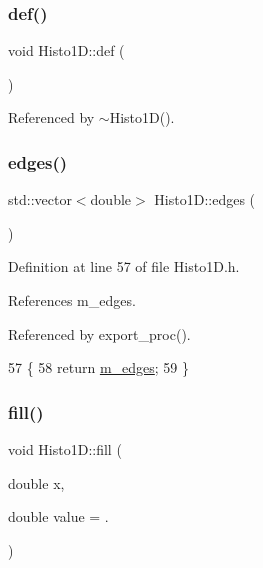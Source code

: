 \subsubsection{\texorpdfstring{def()}{def()}}
{\footnotesize\ttfamily void Histo1\+D\+::def (\begin{DoxyParamCaption}{ }\end{DoxyParamCaption})}



Referenced by $\sim$\+Histo1\+D().

\mbox{\label{classHisto1D_a8c74413d35bce2e244defd470b6b4ebf}} 
\subsubsection{\texorpdfstring{edges()}{edges()}}
{\footnotesize\ttfamily std\+::vector$<$double$>$ Histo1\+D\+::edges (\begin{DoxyParamCaption}{ }\end{DoxyParamCaption})\hspace{0.3cm}{\ttfamily [inline]}}



Definition at line 57 of file Histo1\+D.\+h.



References m\+\_\+edges.



Referenced by export\+\_\+proc().


\begin{DoxyCode}
57                            \{  
58     \textcolor{keywordflow}{return} \hyperlink{classHisto1D_a4188c6d1b4bfc8f9d8bde7616b4dbf5b}{m\_edges};
59   \}
\end{DoxyCode}
\mbox{\label{classHisto1D_a907707c720f8f0d3f582632d186ee7dd}} 
\subsubsection{\texorpdfstring{fill()}{fill()}}
{\footnotesize\ttfamily void Histo1\+D\+::fill (\begin{DoxyParamCaption}\item[{double}]{x,  }\item[{double}]{value = {.} }\end{DoxyParamCaption})}



